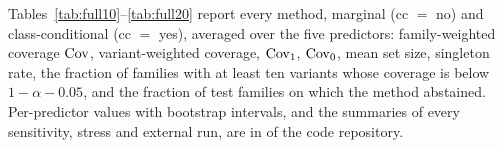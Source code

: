 \begin{table}[h]
\caption{Paired differences in mean set size (variant-weighted): ProtCOVER minus each baseline.}
\label{tab:effsize}
\centering\setlength{\tabcolsep}{3pt}

\end{table}

\begin{table}[h]
\caption{Paired differences in singleton error: ProtCOVER minus each baseline.}
\label{tab:effsingerr}
\centering\setlength{\tabcolsep}{3pt}

\end{table}

\FloatBarrier %
Tables~\ref{tab:full10}--\ref{tab:full20} report every method, marginal (cc $=$ no) and class-conditional (cc $=$ yes), averaged over the five predictors: family-weighted coverage $\mathrm{Cov}$, variant-weighted coverage, $\mathrm{Cov}_1$, $\mathrm{Cov}_0$, mean set size, singleton rate, the fraction of families with at least ten variants whose coverage is below $1-\alpha-0.05$, and the fraction of test families on which the method abstained. Per-predictor values with bootstrap intervals, and the summaries of every sensitivity, stress and external run, are in  of the code repository.

{\setlength{\tabcolsep}{3pt}
}

{\setlength{\tabcolsep}{3pt}
}

{\setlength{\tabcolsep}{3pt}
}
